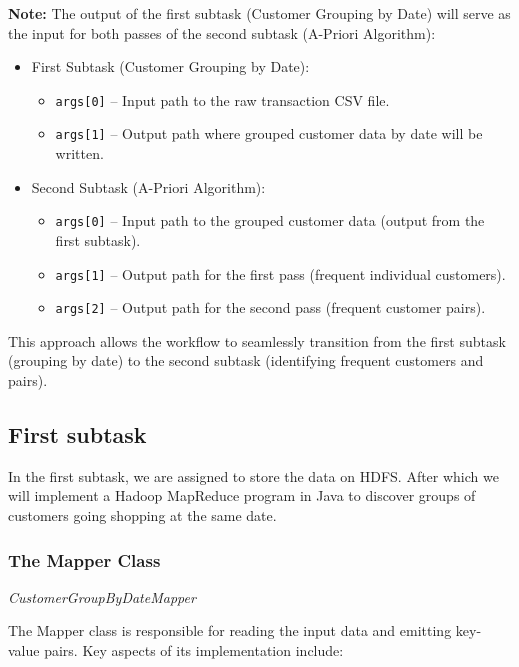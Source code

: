 \textbf{Note:} The output of the first subtask (Customer Grouping by Date) will serve as the input for both passes of the second subtask (A-Priori Algorithm):

\begin{itemize}
    \item First Subtask (Customer Grouping by Date):
    \begin{itemize}
        \item \texttt{args[0]} – Input path to the raw transaction CSV file.
        \item \texttt{args[1]} – Output path where grouped customer data by date will be written.
    \end{itemize}

    \item Second Subtask (A-Priori Algorithm):
    \begin{itemize}
        \item \texttt{args[0]} – Input path to the grouped customer data (output from the first subtask).
        \item \texttt{args[1]} – Output path for the first pass (frequent individual customers).
        \item \texttt{args[2]} – Output path for the second pass (frequent customer pairs).
    \end{itemize}
\end{itemize}

This approach allows the workflow to seamlessly transition from the first subtask (grouping by date) to the second subtask (identifying frequent customers and pairs).

\subsection{First subtask}
\label{subsec:first-subtask}

In the first subtask, we are assigned to store the data on HDFS.
After which we will implement a Hadoop MapReduce program in Java to discover groups of customers going shopping at the same date.

\subsubsection{The Mapper Class} \textit{CustomerGroupByDateMapper}

The Mapper class is responsible for reading the input data and emitting key-value pairs.
Key aspects of its implementation include:

